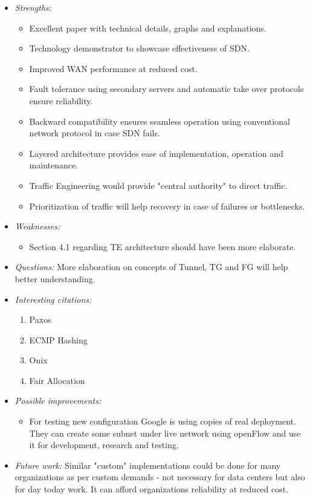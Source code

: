 \documentclass[letterpaper,twocolumn,10pt]{article}
\begin{document}
\begin{itemize}

\item {\it Strengths:} 
\begin{itemize}
\item Excellent paper with technical details, graphs and explanations.
\item Technology demonstrator to showcase effectiveness of SDN.
\item Improved WAN performance at reduced cost.
\item Fault tolerance using secondary servers and automatic take over protocols ensure reliability.
\item Backward compatibility ensures seamless operation using conventional network protocol in case SDN fails.
\item Layered architecture provides ease of implementation, operation and maintenance.
\item Traffic Engineering would provide "central authority" to direct traffic.
\item Prioritization of traffic will help recovery in case of failures or bottlenecks.
\end{itemize}


\item {\it Weaknesses:} 
\begin{itemize}
\item Section 4.1 regarding TE architecture should have been more elaborate.
\end{itemize}


\item {\it Questions:} 
More elaboration on concepts of Tunnel, TG and FG will help better understanding.

\item {\it Interesting citations:} 
\begin{enumerate}
\item Paxos \cite{Paxos}
\item ECMP Hashing \cite{ECMP}
\item Onix \cite{Onix}
\item Fair Allocation \cite{FairAlloc}
\end{enumerate}

\item {\it Possible improvements:} 
\begin{itemize}
\item For testing new configuration Google is using copies of real deployment. They can create some subnet under live network using openFlow and use it for development, research and testing.
\end{itemize}

\item {\it Future work:} 
Similar "custom" implementations could be done for many organizations as per custom demands - not necessary for data centers but also for day today work. It can afford organizations reliability at reduced cost.
\end{itemize}
\end{document}
